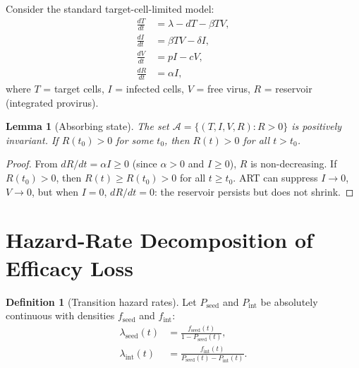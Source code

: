 \documentclass[12pt,a4paper]{article}
\theoremstyle{plain}
\newtheorem{lemma}{Lemma}
\theoremstyle{definition}
\newtheorem{definition}{Definition}
\theoremstyle{remark}
\newcommand{\Pint}{P_{\mathrm{int}}}
\newcommand{\Pseed}{P_{\mathrm{seed}}}
\begin{document}
Consider the standard target-cell-limited model:
\begin{align}
    \frac{dT}{dt} &= \lambda - dT - \beta T V, \label{eq:S-ode-T}\\
    \frac{dI}{dt} &= \beta T V - \delta I, \label{eq:S-ode-I}\\
    \frac{dV}{dt} &= pI - cV, \label{eq:S-ode-V}\\
    \frac{dR}{dt} &= \alpha I, \label{eq:S-ode-R}
\end{align}
where $T$ = target cells, $I$ = infected cells, $V$ = free virus, $R$ = reservoir (integrated provirus).

\begin{lemma}[Absorbing state]\label{lem:S-absorbing}
The set $\mathcal{A} = \{(T,I,V,R) : R > 0\}$ is positively invariant. If $R(t_0) > 0$ for some $t_0$, then $R(t) > 0$ for all $t > t_0$.
\end{lemma}

\begin{proof}
From $dR/dt = \alpha I \geq 0$ (since $\alpha > 0$ and $I \geq 0$), $R$ is non-decreasing. If $R(t_0) > 0$, then $R(t) \geq R(t_0) > 0$ for all $t \geq t_0$. ART can suppress $I \to 0$, $V \to 0$, but when $I = 0$, $dR/dt = 0$: the reservoir persists but does not shrink.
\end{proof}


\section{Hazard-Rate Decomposition of Efficacy Loss}\label{sec:S4}
\setcounter{theorem}{0}
\setcounter{definition}{0}
\setcounter{proposition}{0}
\setcounter{remark}{0}

\begin{definition}[Transition hazard rates]\label{def:S-hazard}
Let $\Pseed$ and $\Pint$ be absolutely continuous with densities $f_{\mathrm{seed}}$ and $f_{\mathrm{int}}$:
\begin{align}
    \lambda_{\mathrm{seed}}(t) &= \frac{f_{\mathrm{seed}}(t)}{1 - \Pseed(t)}, \label{eq:S-lseed}\\
    \lambda_{\mathrm{int}}(t) &= \frac{f_{\mathrm{int}}(t)}{\Pseed(t) - \Pint(t)}. \label{eq:S-lint}
\end{align}
\end{definition}
\end{document}
